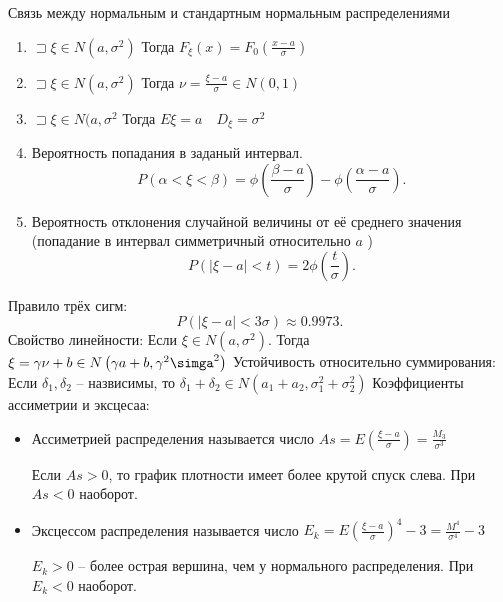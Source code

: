 Связь между нормальным и стандартным нормальным распределениями
\begin{enumerate}
    \item $\sqsupset \xi\in N(a,\sigma^2)$ Тогда $F_\xi(x) = F_0\left( \frac{x-a}{\sigma} \right) $
    \item $\sqsupset \xi\in N(a, \sigma^2)$ Тогда $\nu = \frac{\xi - a}{\sigma}\in N(0,1)$ 
    \item $\sqsupset \xi\in N(a,\sigma^2$ Тогда $E\xi = a\quad D_\xi = \sigma^2$
    \item Вероятность попадания в заданый интервал.
        \[
            P\left( \alpha < \xi < \beta \right) = \phi\left( \frac{\beta -a}{\sigma} \right)  - \phi\left( \frac{\alpha -a}{\sigma} \right) 
        .\] 
    \item Вероятность отклонения случайной величины от её среднего значения (попадание в интервал симметричный относительно $a$ )
        \[
            P\left( |\xi - a|<t \right)  = 2\phi\left( \frac{t}{\sigma} \right) 
        .\] 
\end{enumerate}

Правило трёх сигм:
\[
    P\left( |\xi - a| < 3\sigma \right)  \approx 0.9973
.\] 
Свойство линейности: Если $\xi\in N\left( a, \sigma^2 \right) $. Тогда $\xi = \gamma\nu + b\in N\left( \gamma a + b, \gamma^2\simga^2 \right) $
Устойчивость относительно суммирования: Если $\delta_1, \delta_2$ -- назвисимы, то $\delta_1 + \delta_2\in N\left( a_1+a_2, \sigma_1^2 + \sigma_2^2 \right) $ 
Коэффициенты ассиметрии и эксцесаа:
\begin{itemize}
    \item Ассиметрией распределения называется число $As = E\left( \frac{\xi - a}{\sigma} \right) = \frac{M_3}{\sigma^3}$ 

        Если $As > 0$, то график плотности имеет более крутой спуск слева. При  $As < 0$ наоборот.
    \item Эксцессом распределения называется число  $E_k = E\left( \frac{\xi - a}{\sigma} \right) ^{4} - 3 = \frac{M^4}{\sigma^4} - 3$ 

        $E_k >0$ -- более острая вершина, чем у нормального распределения. При  $E_k < 0$ наоборот.
\end{itemize}
